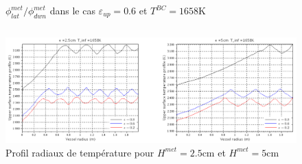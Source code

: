\begin{frame}[fragile]
\begin{columns}[T]
\begin{column}{0.5\textwidth}
\begin{figure}[H]
\baselineskip
{\tiny $\phi^{met}_{lat}/\phi^{met}_{dwn}$ dans le cas $\varepsilon_{up}=0.6$ et $T^{BC}=1658$K}
\end{figure}
    \end{column}
    \end{columns}
\begin{columns}[T]
    \begin{column}{0.6\textwidth}
\begin{figure}[H]
\centering \includegraphics[width=\textwidth]{Figures/Fig8_Peybernes2020.png} \\
\baselineskip
{\tiny Profil radiaux de température pour $H^{met}=2.5$cm et $H^{met}=5$cm}
\end{figure}
    \end{column}
    \end{columns}
\end{frame}
